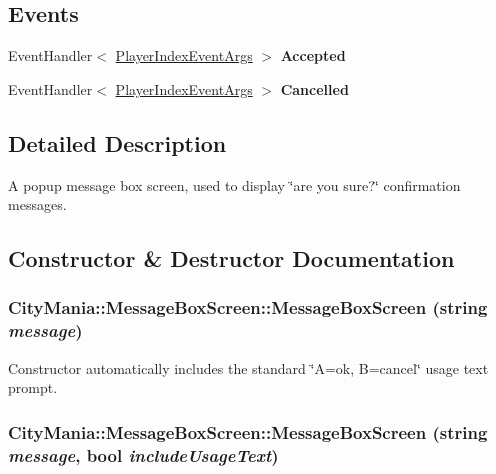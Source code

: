\subsection*{Events}
\begin{DoxyCompactItemize}
\item 
\hypertarget{classCityMania_1_1MessageBoxScreen_a5b87f3daf8dda89152d7b09890182408}{
EventHandler$<$ \hyperlink{classCityMania_1_1PlayerIndexEventArgs}{PlayerIndexEventArgs} $>$ {\bfseries Accepted}}
\label{classCityMania_1_1MessageBoxScreen_a5b87f3daf8dda89152d7b09890182408}

\item 
\hypertarget{classCityMania_1_1MessageBoxScreen_a9552ce3b2d12ada50d1c859b80c275ce}{
EventHandler$<$ \hyperlink{classCityMania_1_1PlayerIndexEventArgs}{PlayerIndexEventArgs} $>$ {\bfseries Cancelled}}
\label{classCityMania_1_1MessageBoxScreen_a9552ce3b2d12ada50d1c859b80c275ce}

\end{DoxyCompactItemize}


\subsection{Detailed Description}
A popup message box screen, used to display \char`\"{}are you sure?\char`\"{} confirmation messages. 

\subsection{Constructor \& Destructor Documentation}
\hypertarget{classCityMania_1_1MessageBoxScreen_aa0d3535d7f9fe9319a6d4194d20fb5ad}{
\subsubsection[{MessageBoxScreen}]{\setlength{\rightskip}{0pt plus 5cm}CityMania::MessageBoxScreen::MessageBoxScreen (string {\em message})}}
\label{classCityMania_1_1MessageBoxScreen_aa0d3535d7f9fe9319a6d4194d20fb5ad}


Constructor automatically includes the standard \char`\"{}A=ok, B=cancel\char`\"{} usage text prompt. \hypertarget{classCityMania_1_1MessageBoxScreen_a040e972bf8f7eff08ffaaa8ba5946537}{
\subsubsection[{MessageBoxScreen}]{\setlength{\rightskip}{0pt plus 5cm}CityMania::MessageBoxScreen::MessageBoxScreen (string {\em message}, \/  bool {\em includeUsageText})}}
\label{classCityMania_1_1MessageBoxScreen_a040e972bf8f7eff08ffaaa8ba5946537}


